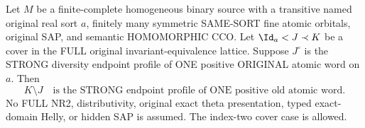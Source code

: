 \begin{theorem}
\label{thm:typed-original-full-cover-layer-word}
Let $M$ be a finite-complete homogeneous
binary source with a transitive named
original real sort $a$, finitely many
symmetric SAME-SORT fine atomic orbitals,
original SAP, and semantic HOMOMORPHIC CCO.
Let $\Id_a<J\prec K$ be a cover in the
FULL original invariant-equivalence lattice.
Suppose $J^\circ$ is the STRONG diversity
endpoint profile of ONE positive ORIGINAL
atomic word on $a$. Then
\[
               K\setminus J
       \quad\text{is the STRONG endpoint profile
                   of ONE positive old atomic word.}
\tag{OWL}\label{eq:typed-original-full-cover-layer-word}
\]
No FULL NR2, distributivity, original exact
theta presentation, typed exact-domain
Helly, or hidden SAP is assumed.
The index-two cover case is allowed.
\end{theorem}
